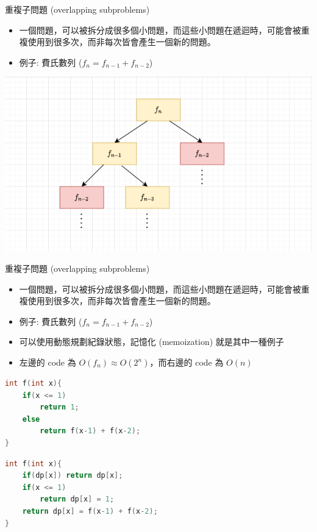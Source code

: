 \documentclass[aspectratio=169]{beamer}
\begin{document}
\begin{frame}{重複子問題 (overlapping subproblems)}
    \begin{itemize}
        \item<1-> 一個問題，可以被拆分成很多個小問題，而這些小問題在遞迴時，可能會被重複使用到很多次，而非每次皆會產生一個新的問題。
        \item<2-> 例子: 費氏數列 ($f_n = f_{n-1} + f_{n-2}$)
    \end{itemize} \pause
    \begin{center}
        \includegraphics[scale=0.45]{images/overlapping_subproblems.png}
    \end{center}
\end{frame}

\begin{frame}[fragile]{重複子問題 (overlapping subproblems)}
    \begin{itemize}
        \item 一個問題，可以被拆分成很多個小問題，而這些小問題在遞迴時，可能會被重複使用到很多次，而非每次皆會產生一個新的問題。
        \item 例子: 費氏數列 ($f_n = f_{n-1} + f_{n-2}$)
        \item 可以使用動態規劃紀錄狀態，記憶化 (memoization) 就是其中一種例子
        \item 左邊的 code 為 $O(f_n) \approx O(2^n)$，而右邊的 code 為 $O(n)$
    \end{itemize} 
    \begin{multicols}{2}
    \begin{lstlisting}[language=C++,basicstyle=\small]
int f(int x){
    if(x <= 1) 
        return 1;
    else
        return f(x-1) + f(x-2);
}
    \end{lstlisting}
    \begin{lstlisting}[language=C++,basicstyle=\small]
int f(int x){
    if(dp[x]) return dp[x];
    if(x <= 1) 
        return dp[x] = 1;
    return dp[x] = f(x-1) + f(x-2);
}
    \end{lstlisting}
    \end{multicols}
\end{frame}
\end{document}
